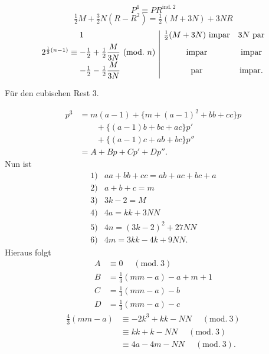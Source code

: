 \[P^4\equiv PR^{\mathrm{ind.}\,2}\]
\[\tfrac12 M+\tfrac32 N(R-R^2)=\tfrac12(M+3N)+3NR\]
\[\begin{array}{r@{}l|cc}
&1&\tfrac12(M+3N)\ \text{impar}&3N\ \text{par}\\[4pt]
2^{\frac13(n-1)}\equiv{}&-\tfrac12+\tfrac12\dfrac{M}{3N}\ (\mathrm{mod.}\ n)&\text{impar}&\text{impar}\\[5pt]
&-\tfrac12-\tfrac12\dfrac{M}{3N}&\text{par}&\text{impar.}
\end{array}\]
\begin{center}Für den cubischen Rest 3.\end{center}
\[\begin{aligned}
p^3&=m(a-1)+\{m+(a-1)^2+bb+cc\}p\\
&\qquad+\{(a-1)b+bc+ac\}p'\\
&\qquad+\{(a-1)c+ab+bc\}p''\\
&=A+Bp+Cp'+Dp''.
\end{aligned}\]
\noindent Nun ist
\[\begin{array}{rl}1)&aa+bb+cc=ab+ac+bc+a\\2)&a+b+c=m\\3)&3k-2=M\\4)&4a=kk+3NN\\5)&4n=(3k-2)^2+27NN\\6)&4m=3kk-4k+9NN.\end{array}\]
\noindent Hieraus folgt
\[\begin{aligned}A&\equiv0\quad\;(\mathrm{mod.}\ 3)\\ B&=\tfrac13(mm-a)-a+m+1\\ C&=\tfrac13(mm-a)-b\\D&=\tfrac13(mm-a)-c\end{aligned}\]
\[\begin{aligned}\tfrac43(mm-a)&\equiv-2k^3+kk-NN\quad\;(\mathrm{mod.}\ 3)\\
&\equiv kk+k-NN\quad\;(\mathrm{mod.}\ 3)\\
&\equiv4a-4m-NN\quad\;(\mathrm{mod.}\ 3).\end{aligned}\]
